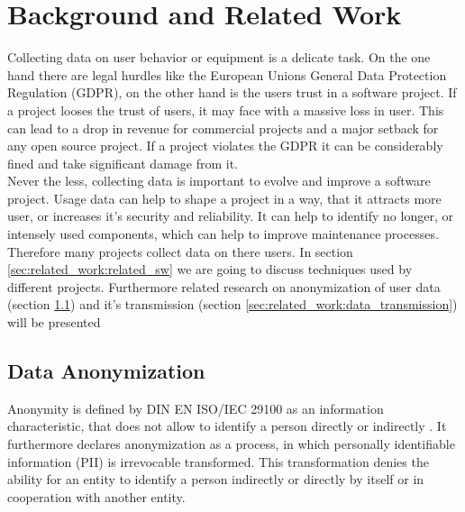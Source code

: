 \chapter{Background and Related Work}
\label{chap:related_work}
%
Collecting data on user behavior or equipment is a delicate task. On the one hand there are legal hurdles like
the European Unions General Data Protection Regulation (GDPR), on the other hand is the users trust
in a software project. If a project looses the trust of users, it may face with a massive loss in
user. This can lead to a drop in revenue for commercial projects and a major setback for any open source
project. If a project violates the GDPR it can be considerably fined and take significant damage from it.\\

Never the less, collecting data is important to evolve and improve a software project. Usage data can help
to shape a project in a way, that it attracts more user, or increases it's security and reliability.
It can help to identify no longer, or intensely used components, which can help to improve maintenance
processes.\\ 



Therefore many projects collect data on there users. In section \ref{sec:related_work:related_sw} we are
going to discuss techniques used by different projects. Furthermore related research on anonymization of user data 
(section \ref{sec:related_work:data_aononymization}) and it's transmission (section \ref{sec:related_work:data_transmission}) will be presented


\section{Data Anonymization}
\label{sec:related_work:data_aononymization}
%
Anonymity is defined by DIN EN ISO/IEC 29100 as an information characteristic, that does not allow to identify a person directly or indirectly \cite{noauthor_din_2020}. It furthermore declares anonymization as a process, in which personally identifiable information (PII) is irrevocable transformed. This transformation denies the ability for an entity to identify a person indirectly or directly by itself or in cooperation with another entity.\\



